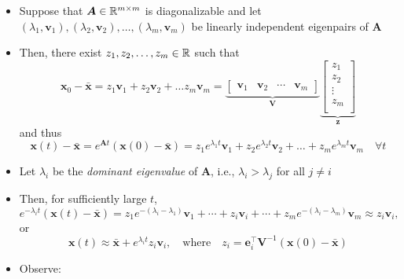 \documentclass[12pt,a4paper]{article}
\begin{document}
\begin{itemize}
\begin{itemize}
  \item Suppose that $\bm{A}\in \mathbb{R}^{m\times m}$ is diagonalizable
    and let
    $(\lambda_{1}, \bm{v}_{1}), (\lambda_{2}, \bm{v}_{2}), \ldots, (\lambda_{m}, \bm{v}_{m})$
    be linearly independent eigenpairs of $\bm{A}$
  \item Then, 
    there exist $z_{1}, z_{2}, \ldots, z_{m}\in \mathbb{R}$ such that
    \begin{equation}\nonumber%
      \bm{x}_{0} - \bar{\bm{x}}
      = z_{1}\bm{v}_{1} + z_{2}\bm{v}_{2}+ \ldots z_{m}\bm{v}_{m}
      =
      \underbrace{\begin{bmatrix}
        \bm{v}_{1} & \bm{v}_{2} & \cdots & \bm{v}_{m}
      \end{bmatrix}}_{\bm{V}}
    \underbrace{
      \begin{bmatrix}
        z_{1} \\
        z_{2} \\
        \vdots \\
        z_{m} \\
      \end{bmatrix}}_{\bm{z}}
    \end{equation}
    and thus
    \begin{equation}\nonumber%
      \bm{x}(t) - \bar{\bm{x}}
      = e^{\bm{A}t}(\bm{x}(0)-\bar{\bm{x}})
      =
      z_{1}e^{\lambda_{1}t}\bm{v}_{1} + z_{2}e^{\lambda_{2}t}\bm{v}_{2} + \ldots + z_{m}e^{\lambda_{m}t}\bm{v}_{m}
      \quad \forall t
    \end{equation}
  \item Let $\lambda_{i}$ be the \emph{dominant eigenvalue} of $\bm{A}$, i.e., 
    $\lambda_{i}> \lambda_{j}$ for all $j\neq i$
  \item Then, for sufficiently large $t$, 
    \begin{equation}\nonumber%
      e^{-\lambda_{i}t}(\bm{x}(t) - \bar{\bm{x}})
      = z_{1}e^{-(\lambda_{i}-\lambda_{1})}\bm{v}_{1}
      + \cdots
      + z_{i}\bm{v}_{i}
      + \cdots
      + z_{m}e^{-(\lambda_{i}-\lambda_{m})}\bm{v}_{m}
      \approx
      z_{i}\bm{v}_{i},
    \end{equation}
    or
    \begin{equation}\nonumber%
      \bm{x}(t) \approx \bar{\bm{x}} + e^{\lambda_{i}t}z_{i}\bm{v}_{i},
      \quad\text{where}\quad
      z_{i} = \bm{e}_{i}^{\top}\bm{V}^{-1}(\bm{x}(0)-\bar{\bm{x}})
    \end{equation}
  \item Observe:

\end{itemize}
\end{itemize}
\end{document}
